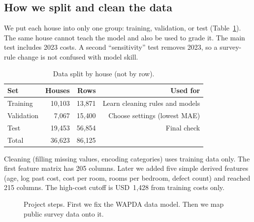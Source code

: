 \documentclass[11pt,a4paper]{article}
\begin{document}
\subsection{How we split and clean the data}

We put each house into only one group: training, validation, or test (Table~\ref{tab:split}). The same house cannot teach the model and also be used to grade it. The main test includes 2023 costs. A second ``sensitivity'' test removes 2023, so a survey-rule change is not confused with model skill.

\begin{table}[ht]
\centering
\caption{Data split by house (not by row).}
\label{tab:split}
\begin{tabular}{@{}lrrr@{}}
\toprule
Set & Houses & Rows & Used for \\
\midrule
Training & 10{,}103 & 13{,}871 & Learn cleaning rules and models \\
Validation & 7{,}067 & 15{,}400 & Choose settings (lowest MAE) \\
Test & 19{,}453 & 56{,}854 & Final check \\
\midrule
Total & 36{,}623 & 86{,}125 & \\
\bottomrule
\end{tabular}
\end{table}

Cleaning (filling missing values, encoding categories) uses training data only. The first feature matrix has 205 columns. Later we added five simple derived features (age, log past cost, cost per room, rooms per bedroom, defect count) and reached 215 columns. The high-cost cutoff is USD~1{,}428 from training costs only.

\begin{figure}[ht]
\centering
{}
\caption{Project steps. First we fix the WAPDA data model. Then we map public survey data onto it.}
\label{fig:flow}
\end{figure}
\end{document}
